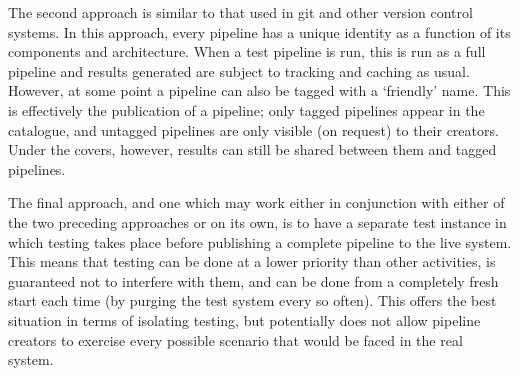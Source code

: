 \documentclass[10pt,a4paper]{article}
\newcommand{\npar}{\par\noindent\space}
\begin{document}
\npar The second approach is similar to that used in git and other version control systems. In this approach, every pipeline has a unique identity as a function of its components and architecture. When a test pipeline is run, this is run as a full pipeline and results generated are subject to tracking and caching as usual. However, at some point a pipeline can also be tagged with a `friendly' name. This is effectively the publication of a pipeline; only tagged pipelines appear in the catalogue, and untagged pipelines are only visible (on request) to their creators. Under the covers, however, results can still be shared between them and tagged pipelines.
\npar The final approach, and one which may work either in conjunction with either of the two preceding approaches or on its own, is to have a separate test instance in which testing takes place before publishing a complete pipeline to the live system. This means that testing can be done at a lower priority than other activities, is guaranteed not to interfere with them, and can be done from a completely fresh start each time (by purging the test system every so often). This offers the best situation in terms of isolating testing, but potentially does not allow pipeline creators to exercise every possible scenario that would be faced in the real system.
\end{document}
